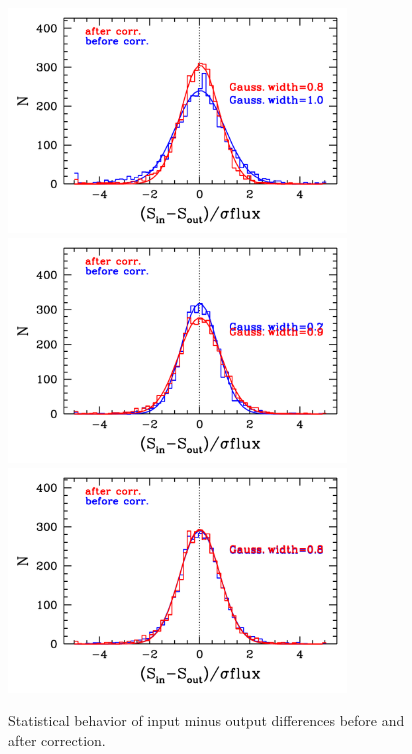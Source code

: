 \documentclass[11pt,a4paper]{article}
\begin{document}
\begin{figure}[H]
	\includegraphics[width=0.8\textwidth]{galsim_24_hist_dfcorr_1}
	\includegraphics[width=0.8\textwidth]{galsim_24_hist_dfcorr_2}
	\includegraphics[width=0.8\textwidth]{galsim_24_hist_dfcorr_3}
	\caption{Statistical behavior of input minus output differences before and after correction.}
\end{figure}


\clearpage



\end{document}
